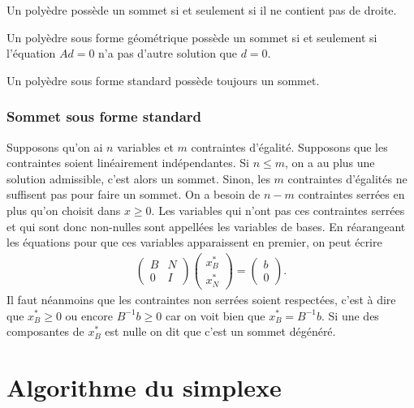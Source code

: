 \begin{myprop}
  Un polyèdre possède un sommet si et seulement si il ne contient
  pas de droite.
\end{myprop}

\begin{myprop}
  Un polyèdre sous forme géométrique possède un sommet si et seulement si
  l'équation $Ad = 0$ n'a pas d'autre solution que $d = 0$.
\end{myprop}

\begin{myprop}
  Un polyèdre sous forme standard possède toujours un sommet.
\end{myprop}

\subsubsection{Sommet sous forme standard}
Supposons qu'on ai $n$ variables et $m$ contraintes d'égalité.
Supposons que les contraintes soient linéairement indépendantes.
Si $n \leq m$, on a au plus une solution admissible, c'est alors un sommet.
Sinon, les $m$ contraintes d'égalités ne suffisent pas pour faire un sommet.
On a besoin de $n-m$ contraintes serrées
en plus qu'on choisit dans $x \geq 0$.
Les variables qui n'ont pas ces contraintes serrées et qui sont donc
non-nulles sont appellées les variables de bases.
En réarangeant les équations pour que ces variables apparaissent en premier,
on peut écrire
\begin{align*}
  \begin{pmatrix}
    B & N\\
    0 & I
  \end{pmatrix}
  \begin{pmatrix}
    x_B^*\\
    x_N^*
  \end{pmatrix} =
  \begin{pmatrix}
    b\\
    0
  \end{pmatrix}.
\end{align*}
Il faut néanmoins que les contraintes non serrées soient respectées,
c'est à dire que $x_B^* \geq 0$ ou encore $B^{-1}b \geq 0$ car
on voit bien que $x_B^* = B^{-1}b$.
Si une des composantes de $x_B^*$ est nulle on dit que c'est un
sommet dégénéré.

\section{Algorithme du simplexe}
